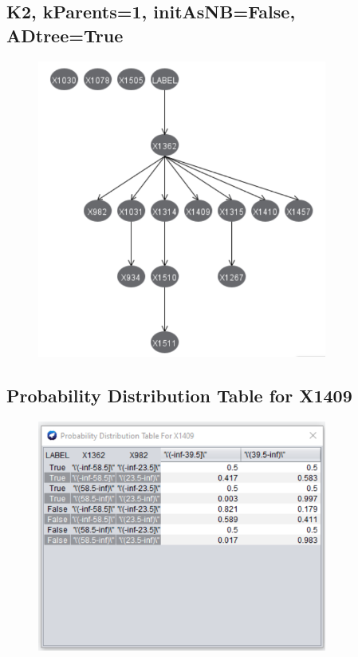 \documentclass[11pt]{article}
\begin{document}
\begin{appendices}
\subsection{K2, kParents=1, initAsNB=False, ADtree=True}\label{image711} 
\begin{figure}[h!]
  \centering
  \includegraphics[width=0.85\textwidth]{images/7_1(1).png}
\end{figure}

\newpage
\subsection{Probability Distribution Table for X1409}\label{image74} 
\begin{figure}[h!]
  \centering
  \includegraphics[width=0.85\textwidth]{images/7_4.png}
\end{figure}

\end{appendices}
\end{document}
